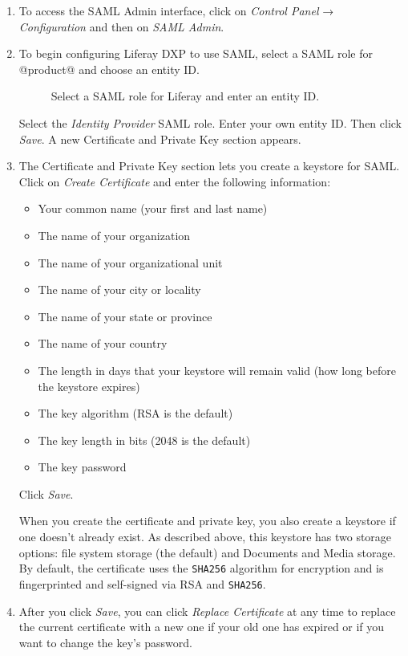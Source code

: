 \begin{enumerate}
\def\labelenumi{\arabic{enumi}.}
\item
  To access the SAML Admin interface, click on \emph{Control Panel} →
  \emph{Configuration} and then on \emph{SAML Admin}.
\item
  To begin configuring Liferay DXP to use SAML, select a SAML role for
  @product@ and choose an entity ID.

  \begin{figure}
  \centering
  \caption{Select a SAML role for Liferay and enter an entity ID.}
  \end{figure}

  Select the \emph{Identity Provider} SAML role. Enter your own entity
  ID. Then click \emph{Save}. A new Certificate and Private Key section
  appears.
\item
  The Certificate and Private Key section lets you create a keystore for
  SAML. Click on \emph{Create Certificate} and enter the following
  information:

  \begin{itemize}
  \tightlist
  \item
    Your common name (your first and last name)
  \item
    The name of your organization
  \item
    The name of your organizational unit
  \item
    The name of your city or locality
  \item
    The name of your state or province
  \item
    The name of your country
  \item
    The length in days that your keystore will remain valid (how long
    before the keystore expires)
  \item
    The key algorithm (RSA is the default)
  \item
    The key length in bits (2048 is the default)
  \item
    The key password
  \end{itemize}

  Click \emph{Save}.

  When you create the certificate and private key, you also create a
  keystore if one doesn't already exist. As described above, this
  keystore has two storage options: file system storage (the default)
  and Documents and Media storage. By default, the certificate uses the
  \texttt{SHA256} algorithm for encryption and is fingerprinted and
  self-signed via RSA and \texttt{SHA256}.
\item
  After you click \emph{Save}, you can click \emph{Replace Certificate}
  at any time to replace the current certificate with a new one if your
  old one has expired or if you want to change the key's password.


\end{enumerate}
